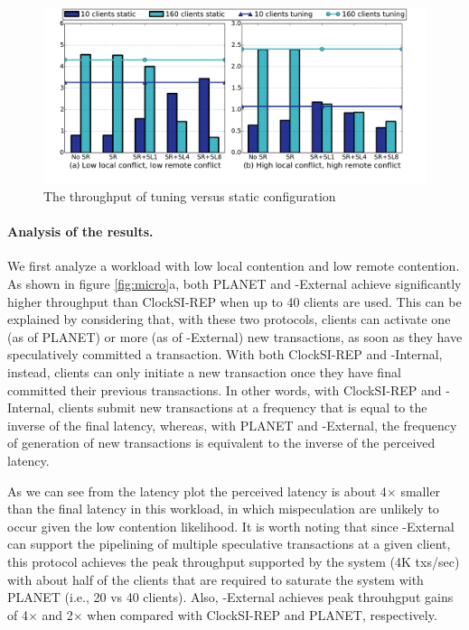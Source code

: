 \begin{figure}[t]
\centering
\def\svgwidth{0.98\columnwidth}
\includegraphics[scale = 0.25]{figures/tuning}
\vspace{-6mm}
\caption{\small The throughput of tuning versus static configuration}
\label{fig:tuning}
\end{figure}

\paragraph{Analysis of the results.} We first analyze a workload with low local contention and low remote contention. As shown in figure \ref{fig:micro}a, both PLANET and {\specula}-External achieve significantly higher throughput than ClockSI-REP when up to 40 clients are used. This can be explained by considering that, with these two protocols, clients can activate one (as of PLANET) or more (as of  {\specula}-External) new transactions, as soon as they have speculatively committed a transaction. With both ClockSI-REP and  {\specula}-Internal, instead, clients can only initiate a new transaction once they have final committed their previous transactions. In other words, with ClockSI-REP and  {\specula}-Internal, clients submit new transactions at a frequency that is equal to the inverse of the final latency, whereas, with PLANET and   {\specula}-External, the frequency of generation of new transactions is equivalent to the inverse of the perceived latency.

As we can see from the latency plot the perceived latency is about 4$\times$ smaller than the final latency in this workload, in which mispeculation are unlikely to occur given the low contention likelihood. It is worth noting that since {\specula}-External  can support the pipelining of multiple speculative transactions at a given client, this protocol achieves the peak throughput supported by the system (4K txs/sec) with about half of the clients that are required to saturate the system with PLANET (i.e., 20 vs 40 clients). Also, {\specula}-External achieves peak throuhgput gains of  4$\times$ and 2$\times$  when compared with ClockSI-REP and PLANET, respectively.

